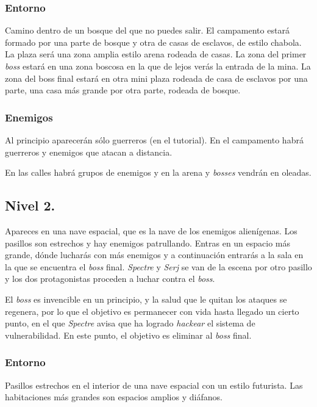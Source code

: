 \documentclass[11pt, twoside]{article}
\begin{document}
\subsubsection{Entorno}
Camino dentro de un bosque del que no puedes salir. El campamento estará formado por una parte de bosque y otra de casas de esclavos, de estilo chabola.  La plaza será una zona amplia estilo arena rodeada de casas. La zona del primer \textit{boss} estará en una zona boscosa en la que de lejos verás la entrada de la mina. La zona del boss final estará en otra mini plaza rodeada de casa de esclavos por una parte, una casa más grande por otra parte, rodeada de bosque.

\subsubsection{Enemigos}
Al principio aparecerán sólo guerreros (en el tutorial). En el campamento habrá guerreros y enemigos que atacan a distancia. 

En las calles habrá grupos de enemigos y en la arena y \textit{bosses} vendrán en oleadas.

\subsection{Nivel 2.}

Apareces en una nave espacial, que es la nave de los enemigos alienígenas. Los pasillos son estrechos y hay enemigos patrullando. Entras en un espacio más grande, dónde lucharás con más enemigos y a continuación entrarás a la sala en la que se encuentra el \textit{boss} final. \textit{Spectre} y \textit{Serj} se van de la escena por otro pasillo y los dos protagonistas proceden a luchar contra el \textit{boss}. 

El \textit{boss} es invencible en un principio, y la salud que le quitan los ataques se regenera, por lo que el objetivo es permanecer con vida hasta llegado un cierto punto, en el que \textit{Spectre} avisa que ha logrado \textit{hackear} el sistema de vulnerabilidad. En este punto, el objetivo es eliminar al \textit{boss} final. 

\subsubsection{Entorno}

Pasillos estrechos en el interior de una nave espacial con un estilo futurista. Las habitaciones más grandes son espacios amplios y diáfanos. 
\end{document}
